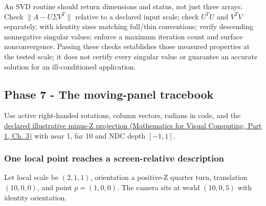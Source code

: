 An SVD routine should return dimensions and status, not just three arrays. Check \(\|A-U\Sigma V^T\|\) relative to a declared input scale; check \(U^TU\) and \(V^TV\) separately, with identity sizes matching full/thin conventions; verify descending nonnegative singular values; enforce a maximum iteration count and surface nonconvergence. Passing these checks establishes those measured properties at the tested scale; it does not certify every singular value or guarantee an accurate solution for an ill-conditioned application.

\subsection{Phase 7 - The moving-panel tracebook}\label{appendix-92ff77d4dfdc-phase-7---the-moving-panel-tracebook}

\hypertarget{appendix-92ff77d4dfdc-phase-7---the-moving-panel-tracebook}{}

Use active right-handed rotations, column vectors, radians in code, and the \href{../02-Mathematics-for-Visual-Computing-P01/main.pdf\#nameddest=01-foundations-i-ch019-figure-m6---follow-one-point-through-named-spaces}{declared illustrative minus-Z projection (Mathematics for Visual Computing, Part 1, Ch. 3)} with near 1, far 10 and NDC depth \([-1,1]\).

\subsubsection{One local point reaches a screen-relative description}\label{appendix-92ff77d4dfdc-one-local-point-reaches-a-screen-relative-description}

\hypertarget{appendix-92ff77d4dfdc-one-local-point-reaches-a-screen-relative-description}{}

Let local scale be \((2,1,1)\), orientation a positive-Z quarter turn, translation \((10,0,0)\), and point \(p=(1,0,0)\). The camera sits at world \((10,0,5)\) with identity orientation.

